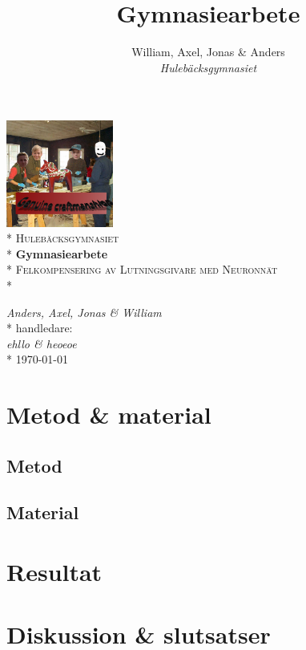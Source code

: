 \documentclass[]{article}
\title{Gymnasiearbete}
\author{William, Axel, Jonas \& Anders \\
\emph{Hulebäcksgymnasiet}}
\begin{document}
\begin{titlepage}
	\centering
	\includegraphics[height=3.5cm]{messengerpicture.png}\\*
	\vspace{0.6cm}
	{\scshape\LARGE Hulebäcksgymnasiet}\\*
	\vspace{0.5cm}
	{\bfseries\Large Gymnasiearbete}\\*
	\vspace{2cm}
	{\scshape\huge Felkompensering av Lutningsgivare med Neuronnät}\\*

	\vfill

	{\Large\itshape Anders, Axel, Jonas \& William}\\*
	\vspace{0.4cm}
	{\large handledare:\\
	{\itshape ehllo \& heoeoe}}\\*
	\vspace{0.4cm}
	{\today}
\end{titlepage}

\tableofcontents
\cleardoublepage
{}



\section{Metod \& material}

\subsection{Metod}

\subsection{Material}

\section{Resultat}

\section{Diskussion \& slutsatser}
\end{document}
